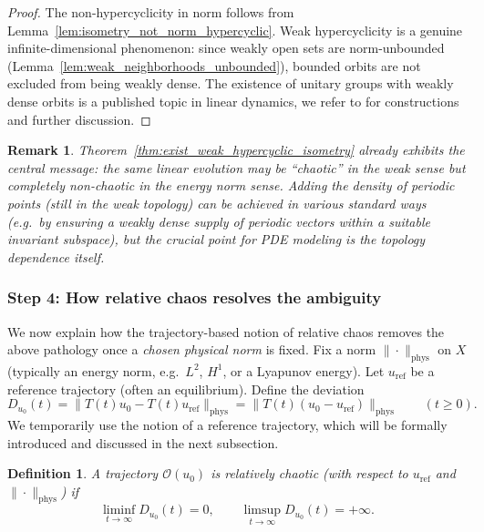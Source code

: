 \documentclass[12pt]{article}
\newtheorem{definition}[theorem]{Definition}
\newtheorem{remark}[theorem]{Remark}
\begin{document}
\begin{proof}
The non-hypercyclicity in norm follows from Lemma~\ref{lem:isometry_not_norm_hypercyclic}. Weak hypercyclicity is a genuine infinite-dimensional phenomenon: since weakly open sets are norm-unbounded
(Lemma~\ref{lem:weak_neighborhoods_unbounded}), bounded orbits are not excluded from being weakly dense. The existence of unitary groups with weakly dense orbits is a published topic in linear dynamics, we refer to \cite{BayartMatheron2009,GrosseErdmannPeris2011} for constructions and further discussion.
\end{proof}

\begin{remark}
Theorem~\ref{thm:exist_weak_hypercyclic_isometry} already exhibits the central message:
\emph{the same linear evolution may be ``chaotic'' in the weak sense but completely non-chaotic in the energy norm sense.} Adding the density of periodic points (still in the weak topology) can be achieved in various standard ways (e.g.\ by ensuring a weakly dense supply of periodic vectors within a suitable invariant subspace),
but the crucial point for PDE modeling is the topology dependence itself.
\end{remark}

\subsubsection*{Step 4: How relative chaos resolves the ambiguity}

We now explain how the trajectory-based notion of relative chaos removes the above pathology once a \emph{chosen physical norm} is fixed. Fix a norm $\|\cdot\|_{\mathrm{phys}}$ on $X$ (typically an energy norm, e.g.\ $L^2$, $H^1$, or a Lyapunov energy). Let $u_{\mathrm{ref}}$ be a reference trajectory (often an equilibrium).
Define the deviation
\[
D_{u_0}(t)=\|T(t)u_0-T(t)u_{\mathrm{ref}}\|_{\mathrm{phys}}
=\|T(t)(u_0-u_{\mathrm{ref}})\|_{\mathrm{phys}}
\qquad (t\ge 0).
\]
We temporarily use the notion of a reference trajectory, which will be formally introduced and discussed in the next subsection.

\begin{definition}\label{def:relative_chaos_remedy}
A trajectory $\mathcal{O}(u_0)$ is \emph{relatively chaotic} (with respect to $u_{\mathrm{ref}}$ and $\|\cdot\|_{\mathrm{phys}}$) if
\[
\liminf_{t\to\infty} D_{u_0}(t)=0,
\qquad
\limsup_{t\to\infty} D_{u_0}(t)=+\infty.
\]
\end{definition}
\end{document}
